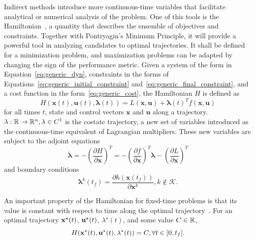 Indirect methods introduce more continuous-time variables that facilitate analytical or numerical analysis of the problem. One of this tools is the Hamiltonian~\cite{Conway_2010}, a quantity that describes the ensemble of objectives and constraints. Together with Pontryagin's Minimum Principle, it will provide a powerful tool in analyzing candidates to optimal trajectories. It shall be defined for a minimization problem, and maximization problems can be adapted by changing the sign of the performance metric. Given a system of the form in Equation~\eqref{eq:generic_dyn}, constraints in the forms of Equations~\eqref{eq:generic_initial_constraint} and~\eqref{eq:generic_final_constraint}, and a cost function in the form~\eqref{eq:generic_cost}, the Hamiltonian \(H\) is defined as~\cite{bertsekas}
\begin{equation}
    H(\mathbf{x}(t), \mathbf{u}(t), \mathbf{\lambda}(t)) = L(\mathbf{x}, \mathbf{u}) + \mathbf{\lambda}{(t)}^T f(\mathbf{x}, \mathbf{u})
\end{equation}
for all times \(t\), state and control vectors \(\mathbf{x}  \) and \(\mathbf{u}\) along a trajectory.\ \( \mathbf{\lambda}: \mathbb{R} \rightarrow \mathbb{R}^n, \mathbf{\lambda} \in C^1\) is the costate trajectory, a new set of variables introduced as the continuous-time equivalent of Lagrangian multipliers. These new variables are subject to the adjoint equations
\begin{equation}
    \dot{\mathbf{\lambda}} = - \left( \frac{\partial H}{\partial \mathbf{x}} \right)^T = -\left( \frac{\partial f}{\partial \mathbf{x}} \right)^T \mathbf{\lambda} - \left( \frac{\partial L}{\partial \mathbf{x}} \right)^T
\end{equation}
and boundary conditions~\cite{bryson_applied_optimal_control}
\begin{equation}\label{eq:final_costate}
    \mathbf{\lambda}^k(t_f) = \frac{\partial h(\mathbf{x}(t_f))}{\partial \mathbf{x}^k}, k \notin \mathcal{K}.
\end{equation}

An important property of the Hamiltonian for fixed-time problems is that its value is constant with respect to time along the optimal trajectory~\cite{bertsekas}. For an optimal trajectory \(\mathbf{x}^\star(t)\), \(\mathbf{u}^\star(t)\), \(\lambda^\star(t)\), and some value \(C \in \mathbb{R}\),
\begin{equation}\label{eq:constant_hamilt}
    H(\x^\star(t), \uc^\star(t), \lambda^\star(t)) = C, \forall t \in [0, t_f].
\end{equation}

